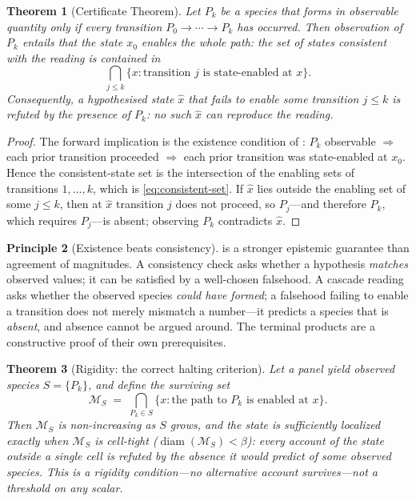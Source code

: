 \documentclass[11pt,a4paper]{article}
\theoremstyle{cfcthm}
\newtheorem{theorem}{Theorem}[section]
\theoremstyle{definition}
\newtheorem{principle}[theorem]{Principle}
\theoremstyle{remark}
\newcommand{\Man}{\mathcal{M}}          %
\newcommand{\st}{x}                     %
\newcommand{\flo}{\beta}                %
\newcommand{\set}[1]{\{#1\}}
\newcommand{\diam}{\operatorname{diam}}
\begin{document}
\begin{theorem}[Certificate Theorem]
\label{thm:certificate}
Let $P_k$ be a species that forms in observable quantity only if every
transition $P_0\to\cdots\to P_k$ has occurred. Then observation of $P_k$
\emph{entails} that the state $\st_0$ enables the whole path: the set of states
consistent with the reading is contained in
\begin{equation}
\bigcap_{j\le k}\set{\st:\text{transition }j\text{ is state-enabled at }\st}.
\label{eq:consistent-set}
\end{equation}
Consequently, a hypothesised state $\hat\st$ that fails to enable some
transition $j\le k$ is \emph{refuted} by the presence of $P_k$: no such
$\hat\st$ can reproduce the reading.
\end{theorem}

\begin{proof}
The forward implication is the existence condition of :
$P_k$ observable $\Rightarrow$ each prior transition proceeded $\Rightarrow$
each prior transition was state-enabled at $\st_0$. Hence the consistent-state
set is the intersection of the enabling sets of transitions $1,\dots,k$, which
is \eqref{eq:consistent-set}. If $\hat\st$ lies outside the enabling set of
some $j\le k$, then at $\hat\st$ transition $j$ does not proceed, so $P_j$---and
therefore $P_k$, which requires $P_j$---is absent; observing $P_k$ contradicts
$\hat\st$.
\end{proof}

\begin{principle}[Existence beats consistency]
\label{prin:existence}
 is a stronger epistemic guarantee than agreement of
magnitudes. A consistency check asks whether a hypothesis \emph{matches}
observed values; it can be satisfied by a well-chosen falsehood. A cascade
reading asks whether the observed species \emph{could have formed}; a falsehood
failing to enable a transition does not merely mismatch a number---it predicts
a species that is \emph{absent}, and absence cannot be argued around. The
terminal products are a constructive proof of their own prerequisites.
\end{principle}

\begin{theorem}[Rigidity: the correct halting criterion]
\label{thm:rigidity}
Let a panel yield observed species $S=\set{P_k}$, and define the
\emph{surviving set}
\begin{equation}
\Man_S\;=\;\bigcap_{P_k\in S}\set{\st:\text{the path to }P_k\text{ is enabled at }\st}.
\label{eq:surviving}
\end{equation}
Then $\Man_S$ is non-increasing as $S$ grows, and the state is
\emph{sufficiently localized} exactly when $\Man_S$ is cell-tight
($\diam(\Man_S)<\flo$): every account of the state outside a single cell is
refuted by the absence it would predict of some observed species. This is a
\emph{rigidity} condition---no alternative account survives---not a threshold on
any scalar.
\end{theorem}
\end{document}
